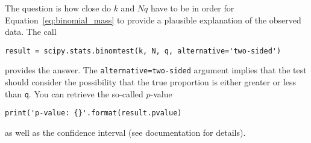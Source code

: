\documentclass[12pt]{article}
\begin{document}
The question is how close do $k$ and $Nq$ have to be in order for
Equation~\ref{eq:binomial_mass} to provide a plausible explanation of the
observed data.  The call
\begin{verbatim}
result = scipy.stats.binomtest(k, N, q, alternative='two-sided')
\end{verbatim}
provides the answer.  The \texttt{alternative=two-sided} argument
implies that the test should consider the possibility that the true
proportion is either greater or less than \texttt{q}.  You can
retrieve the so-called $p$-value
\begin{verbatim}
print('p-value: {}'.format(result.pvalue)
\end{verbatim}
as well as the confidence interval (see documentation for details).

\end{document}
